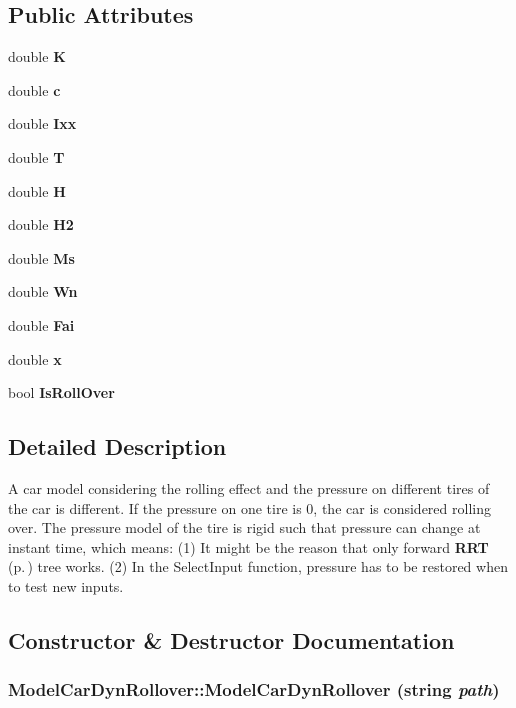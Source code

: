 \subsection*{Public Attributes}
\begin{CompactItemize}
\item 
double {\bf K}
\item 
double {\bf c}
\item 
double {\bf Ixx}
\item 
double {\bf T}
\item 
double {\bf H}
\item 
double {\bf H2}
\item 
double {\bf Ms}
\item 
double {\bf Wn}
\item 
double {\bf Fai}
\item 
double {\bf x}
\item 
bool {\bf Is\-Roll\-Over}
\end{CompactItemize}


\subsection{Detailed Description}
A car model considering the rolling effect and the pressure on different tires of the car is different. If the pressure on one tire is 0, the car is considered rolling over. The pressure model of the tire is rigid such that pressure can change at instant time, which means: (1) It might be the reason that only forward {\bf RRT} {\rm (p.\,\pageref{classRRT})} tree works. (2) In the Select\-Input function, pressure has to be restored when to test new inputs.



\subsection{Constructor \& Destructor Documentation}
\subsubsection{\setlength{\rightskip}{0pt plus 5cm}Model\-Car\-Dyn\-Rollover::Model\-Car\-Dyn\-Rollover (string {\em path})}\label{classModelCarDynRollover_a0}


